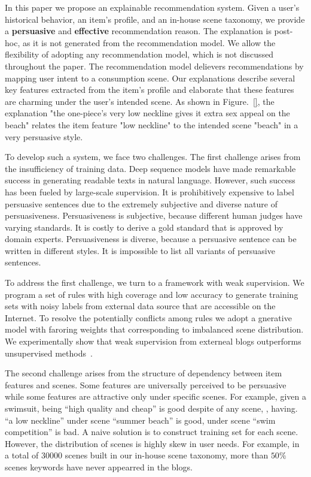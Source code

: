 \documentclass[sigconf]{acmart}
\begin{document}
In this paper we propose an explainable recommendation system. Given a user's historical behavior, an item's profile, and an in-house scene taxonomy, we provide a  \textbf{persuasive} and \textbf{effective} recommendation reason. The explanation is post-hoc, as it is not generated from the recommendation model. We allow the flexibility of adopting any recommendation model, which is not discussed throughout the paper. The  recommendation model delievers recommendations by mapping user intent to a consumption scene. Our explanations describe several key features extracted from the item's profile and elaborate that these features are charming under the user's intended scene. As shown in Figure.~\ref{}, the explanation "the one-piece's very low neckline gives it extra sex appeal on the beach" relates the item feature "low neckline" to the intended scene "beach" in a very persuasive style.  

To develop such a system, we face two challenges.  The first challenge arises from the insufficiency of training data. Deep sequence models have made remarkable success in generating readable texts in natural language. However, such success has been fueled by large-scale supervision. It is prohibitively expensive to label persuasive sentences due to the extremely subjective and diverse nature of persuasiveness. Persuasiveness is subjective, because different human judges have varying standards. It is costly to derive a gold standard that is approved by domain experts. Persuasiveness is diverse, because a persuasive sentence can be written in different styles.  It is impossible to list all variants of persuasive sentences.   
 
To address the first challenge, we turn to a framework with weak supervision. We program a set of rules with high coverage and low accuracy to generate training sets with noisy labels from external data source that are accessible on the Internet. To resolve the potentially conflicts among rules we adopt a gnerative model with faroring weights that corresponding to imbalanced scene distribution. We experimentally show that weak supervision from externeal blogs outperforms unsupervised methods~\cite{munigala2018persuaide}. %

The second challenge arises from the structure of dependency between item features and scenes. Some features are universally perceived to be persuasive while some features are attractive only under specific scenes. For example, given a swimsuit, being ``high quality and cheap'' is good despite of any scene, , having. ``a low neckline'' under scene ``summer beach'' is good, under scene ``swim competition'' is bad. 
A naive solution is to construct training set for each scene.
However, the distribution of scenes is highly skew in user needs. For example, in a total of $30000$ scenes built in our in-house scene taxonomy, more than $50\%$ scenes keywords have never appearred in the blogs. %
\end{document}
